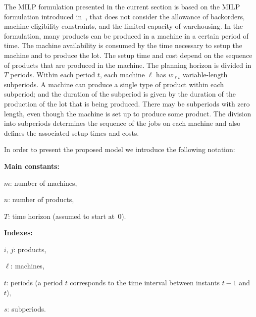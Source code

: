 \documentclass[11pt]{article}
\begin{document}
The MILP formulation presented in the current section is based on the MILP formulation introduced in~\citet{meyr2002simultaneous}, that does not consider the allowance of backorders, machine eligibility constraints, and the limited capacity of warehousing. In the formulation, many products can be produced in a machine in a certain period of time. The machine availability is consumed by the time necessary to setup the machine and to produce the lot. The setup time and cost depend on the sequence of products that are produced in the machine. The planning horizon is divided in $T$ periods. Within each period $t$,  each machine $\ell$ has $w_{\ell t}$ variable-length subperiods. A machine can produce a single type of product within each subperiod; and the duration of the subperiod is given by the duration of the production of the lot that is being produced. There may be subperiods with zero length, even though the machine is set up to produce some product. The division into subperiods determines the sequence of the jobs on each machine and also defines the associated setup times and costs.

In order to present the proposed model we introduce the following notation:

\noindent
\textbf{Main constants:}
\begin{description}[topsep=2pt,itemsep=1pt]
\item[]$m$: number of machines,
\item[]$n$: number of products,
\item[]$T$:	time horizon (assumed to start at~$0$).
\end{description}

\noindent
\textbf{Indexes:}
\begin{description}[topsep=2pt,itemsep=1pt]
\item[]$i$, $j$: products,
\item[]$\ell$: machines,
\item[]$t$:	periods (a period $t$ corresponds to the time interval between instants $t-1$ and $t$),
\item[]$s$:	subperiods.
\end{description}
\end{document}
